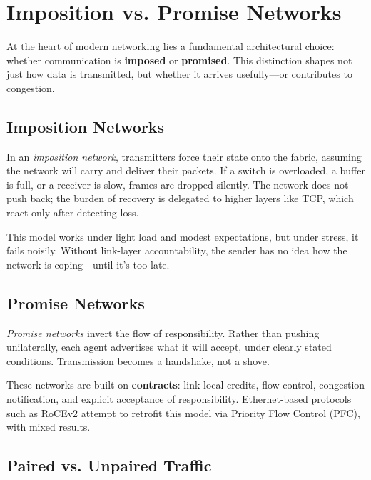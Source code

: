 \documentclass[../../../OAE-SPEC-MAIN.tex]{subfiles}
\begin{document}
\section{Imposition vs. Promise Networks}

At the heart of modern networking lies a fundamental architectural choice: whether communication is \textbf{imposed} or \textbf{promised}. This distinction shapes not just how data is transmitted, but whether it arrives usefully—or contributes to congestion.

\subsection*{Imposition Networks}

In an \emph{imposition network}, transmitters force their state onto the fabric, assuming the network will carry and deliver their packets. If a switch is overloaded, a buffer is full, or a receiver is slow, frames are dropped silently. The network does not push back; the burden of recovery is delegated to higher layers like TCP, which react only after detecting loss.

This model works under light load and modest expectations, but under stress, it fails noisily. Without link-layer accountability, the sender has no idea how the network is coping—until it’s too late.

\subsection*{Promise Networks}

\emph{Promise networks} invert the flow of responsibility. Rather than pushing unilaterally, each agent advertises what it will accept, under clearly stated conditions. Transmission becomes a handshake, not a shove.

These networks are built on \textbf{contracts}: link-local credits, flow control, congestion notification, and explicit acceptance of responsibility. Ethernet-based protocols such as RoCEv2 attempt to retrofit this model via Priority Flow Control (PFC), with mixed results.

\subsection*{Paired vs. Unpaired Traffic}
\end{document}
